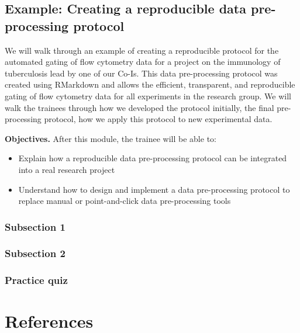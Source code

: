 \documentclass[]{tufte-book}
\providecommand{\tightlist}{%
  \setlength{\itemsep}{0pt}\setlength{\parskip}{0pt}}
\begin{document}
\hypertarget{example-creating-a-reproducible-data-pre-processing-protocol}{%
\section{Example: Creating a reproducible data pre-processing protocol}\label{example-creating-a-reproducible-data-pre-processing-protocol}}

We will walk through an example of creating a reproducible protocol for the
automated gating of flow cytometry data for a project on the immunology of
tuberculosis lead by one of our Co-Is. This data pre-processing protocol was
created using RMarkdown and allows the efficient, transparent, and reproducible
gating of flow cytometry data for all experiments in the research group. We will
walk the trainees through how we developed the protocol initially, the final
pre-processing protocol, how we apply this protocol to new experimental data.

\textbf{Objectives.} After this module, the trainee will be able to:

\begin{itemize}
\tightlist
\item
  Explain how a reproducible data pre-processing protocol can be integrated into
  a real research project
\item
  Understand how to design and implement a data pre-processing protocol to
  replace manual or point-and-click data pre-processing tools
\end{itemize}

\hypertarget{subsection-1-15}{%
\subsection{Subsection 1}\label{subsection-1-15}}

\hypertarget{subsection-2-14}{%
\subsection{Subsection 2}\label{subsection-2-14}}

\hypertarget{practice-quiz-4}{%
\subsection{Practice quiz}\label{practice-quiz-4}}

\hypertarget{references}{%
\chapter{References}\label{references}}


\end{document}
